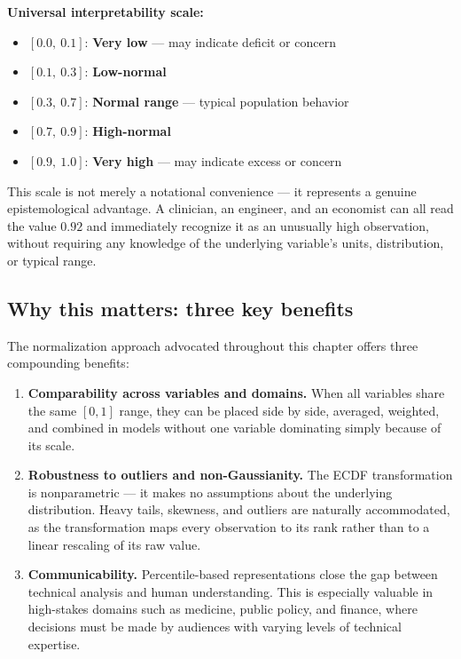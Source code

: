 \textbf{Universal interpretability scale:}
\begin{itemize}
    \item $[0.0,\ 0.1]$: \textbf{Very low} — may indicate deficit or concern
    \item $[0.1,\ 0.3]$: \textbf{Low-normal}
    \item $[0.3,\ 0.7]$: \textbf{Normal range} — typical population behavior
    \item $[0.7,\ 0.9]$: \textbf{High-normal}
    \item $[0.9,\ 1.0]$: \textbf{Very high} — may indicate excess or concern
\end{itemize}
\vspace{0.3cm}
This scale is not merely a notational convenience — it represents a genuine epistemological advantage. A clinician, an engineer, and an economist can all read the value $0.92$ and immediately recognize it as an unusually high observation, without requiring any knowledge of the underlying variable's units, distribution, or typical range.

\subsection*{Why this matters: three key benefits}
The normalization approach advocated throughout this chapter offers three compounding benefits:
\begin{enumerate}
    \item \textbf{Comparability across variables and domains.} When all variables share the same $[0,1]$ range, they can be placed side by side, averaged, weighted, and combined in models without one variable dominating simply because of its scale.

\item \textbf{Robustness to outliers and non-Gaussianity.} The ECDF transformation is nonparametric — it makes no assumptions about the underlying distribution. Heavy tails, skewness, and outliers are naturally accommodated, as the transformation maps every observation to its rank rather than to a linear rescaling of its raw value.

\item \textbf{Communicability.} Percentile-based representations close the gap between technical analysis and human understanding. This is especially valuable in high-stakes domains such as medicine, public policy, and finance, where decisions must be made by audiences with varying levels of technical expertise.
\end{enumerate}

